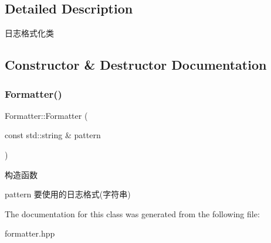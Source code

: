 \subsection{Detailed Description}
日志格式化类 

\subsection{Constructor \& Destructor Documentation}
\mbox{\label{classFormatter_a8127e81475ca541209942dfadab6cfa3}} 
\subsubsection{\texorpdfstring{Formatter()}{Formatter()}}
{\footnotesize\ttfamily Formatter\+::\+Formatter (\begin{DoxyParamCaption}\item[{const std\+::string \&}]{pattern }\end{DoxyParamCaption})}



构造函数 

pattern 要使用的日志格式(字符串) 

The documentation for this class was generated from the following file\+:\begin{DoxyCompactItemize}
\item 
formatter.\+hpp\end{DoxyCompactItemize}
